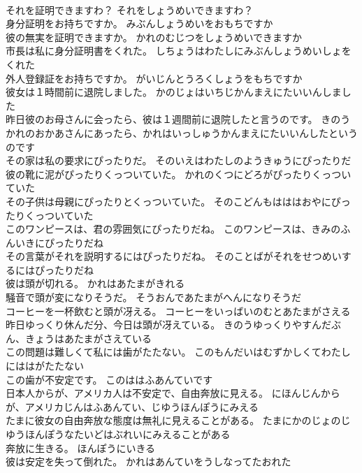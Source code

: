 \documentclass[8pt]{extreport}
\begin{document}
\begin{CJK}{UTF8}{min}
\\	それを証明できますわ？	それをしょうめいできますわ？ 
\\	身分証明をお持ちですか。	みぶんしょうめいをおもちですか 
\\	彼の無実を証明できますか。	かれのむじつをしょうめいできますか 
\\	市長は私に身分証明書をくれた。	しちょうはわたしにみぶんしょうめいしょをくれた 
\\	外人登録証をお持ちですか。	がいじんとうろくしょうをもちですか 
\\	彼女は１時間前に退院しました。	かのじょはいちじかんまえにたいいんしました 
\\	昨日彼のお母さんに会ったら、彼は１週間前に退院したと言うのです。	きのうかれのおかあさんにあったら、かれはいっしゅうかんまえにたいいんしたというのです 
\\	その家は私の要求にぴったりだ。	そのいえはわたしのようきゅうにぴったりだ 
\\	彼の靴に泥がぴったりくっついていた。	かれのくつにどろがぴったりくっついていた 
\\	その子供は母親にぴったりとくっついていた。	そのこどんもはははおやにぴったりくっついていた 
\\	このワンピースは、君の雰囲気にぴったりだね。	このワンピースは、きみのふんいきにぴったりだね 
\\	その言葉がそれを説明するにはぴったりだね。	そのことばがそれをせつめいするにはぴったりだね 
\\	彼は頭が切れる。	かれはあたまがきれる 
\\	騒音で頭が変になりそうだ。	そうおんであたまがへんになりそうだ 
\\	コーヒーを一杯飲むと頭が冴える。	コーヒーをいっばいのむとあたまがさえる 
\\	昨日ゆっくり休んだ分、今日は頭が冴えている。	きのうゆっくりやすんだぶん、きょうはあたまがさえている 
\\	この問題は難しくて私には歯がたたない。	このもんだいはむずかしくてわたしにははがたたない 
\\	この歯が不安定です。	このははふあんていです 
\\	日本人からが、アメリカ人は不安定で、自由奔放に見える。	にほんじんからが、アメリカじんはふあんてい、じゆうほんぽうにみえる 
\\	たまに彼女の自由奔放な態度は無礼に見えることがある。	たまにかのじょのじゆうほんぽうなたいどはぶれいにみえることがある 
\\	奔放に生きる。	ほんぽうにいきる 
\\	彼は安定を失って倒れた。	かれはあんていをうしなってたおれた 

\end{CJK}
\end{document}
